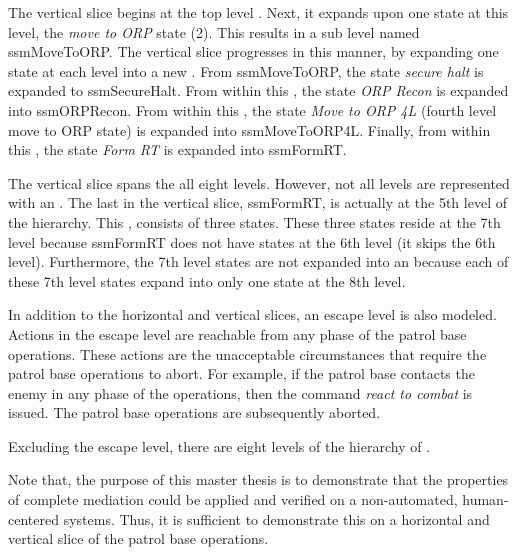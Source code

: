 \documentclass[../../main/main.tex]{subfiles}
\begin{document}
The vertical slice begins at the top level .  Next, it expands upon one state at this level, the \textit{move to ORP} state (2).  This results in a sub level  named ssmMoveToORP.  The vertical slice progresses in this manner, by expanding one state at each level into a new .  From ssmMoveToORP, the state \textit{secure halt} is expanded to ssmSecureHalt.  From within this , the state \textit{ORP Recon} is expanded into ssmORPRecon.  From within this , the state \textit{Move to ORP 4L} (fourth level move to ORP state) is expanded into ssmMoveToORP4L.  Finally, from within this , the state \textit{Form RT} is expanded into ssmFormRT.

The vertical slice spans the all eight levels.  However, not all levels are represented with an .  The last  in the vertical slice, ssmFormRT, is actually at the 5th level of the hierarchy.  This , consists of three states.  These three states reside at the 7th level because ssmFormRT does not have states at the 6th level (it skips the 6th level).  Furthermore, the 7th level states are not expanded into an  because each of these 7th level states expand into only one state at the 8th level.  

In addition to the horizontal and vertical slices, an escape level is also modeled.  Actions in the escape level are reachable from any phase of the patrol base operations.  These actions are the unacceptable circumstances that require the patrol base operations to abort.  For example, if the patrol base contacts the enemy in any phase of the operations, then the command \textit{react to combat} is issued.  The patrol base operations are subsequently aborted.  

Excluding the escape level, there are eight levels of the hierarchy of .

Note that, the purpose of this master thesis is to demonstrate that the properties of complete mediation could be applied and verified on a non-automated, human-centered systems. Thus, it is sufficient to demonstrate this on a horizontal and vertical slice of the patrol base operations.  

\end{document}
